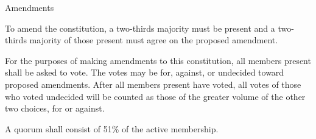{
	\begin{article}{Amendments}
		\item To amend the constitution, a two-thirds majority must be present and a two-thirds majority of those present must agree on the proposed amendment.
		\item For the purposes of making amendments to this constitution, all members present shall be asked to vote.  The votes may be for, against, or undecided toward proposed amendments. After all members present have voted, all votes of those who voted undecided will be counted as those of the greater volume of the other two choices, for or against.
		\item A quorum shall consist of 51\% of the active membership.
	\end{article}
}